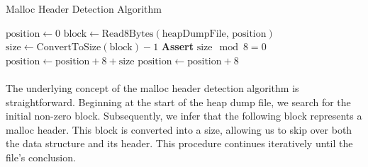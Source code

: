         \begin{algorithm}[H]
            \caption{Malloc Header Detection Algorithm}
            \begin{algorithmic}[1]
                \State $\text{position} \gets 0$
                    \State $\text{block} \gets \text{Read8Bytes}(\text{heapDumpFile, position})$
                        \State $\text{size} \gets \text{ConvertToSize}(\text{block}) - 1$ 
                        \State \textbf{Assert} $ \text{size} \mod 8 = 0$ 
                        \State $\text{position} \gets \text{position} + 8 + \text{size}$ 
                    \Else
                        \State $\text{position} \gets \text{position} + 8$
                    \EndIf
                \EndWhile
            \EndProcedure
            \end{algorithmic}
        \end{algorithm}

        \paragraph{}The underlying concept of the malloc header detection algorithm is straightforward. Beginning at the start of the heap dump file, we search for the initial non-zero block. Subsequently, we infer that the following block represents a malloc header. This block is converted into a size, allowing us to skip over both the data structure and its header. This procedure continues iteratively until the file's conclusion.
